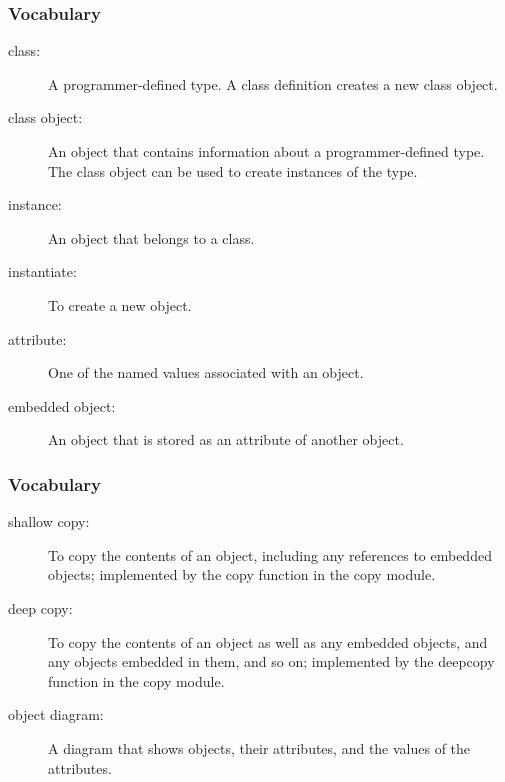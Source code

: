 \documentclass{beamer}
\newcommand{\li}{\item}
\newcommand{\bfr}[1]{\begin{frame}[fragile]\frametitle{{ #1 }}}
\begin{document}
\bfr{Vocabulary}
\begin{description}
\li[class:]
A programmer-defined type. A class definition creates a new class object.
\li[class object:]
An object that contains information about a programmer-defined type. The class object can be used to create instances of the type.
\li[instance:]
An object that belongs to a class.
\li[instantiate:]
To create a new object.
\li[attribute:]
One of the named values associated with an object.
\li[embedded object:]
An object that is stored as an attribute of another object.
\end{description}
\end{frame}

\bfr{Vocabulary}
\begin{description}
\li[shallow copy:]
To copy the contents of an object, including any references to embedded objects; implemented by the copy function in the copy module.
\li[deep copy:]
To copy the contents of an object as well as any embedded objects, and any objects embedded in them, and so on; implemented by the deepcopy function in the copy module.
\li[object diagram:]
A diagram that shows objects, their attributes, and the values of the attributes.
\end{description}
\end{frame}
\end{document}
